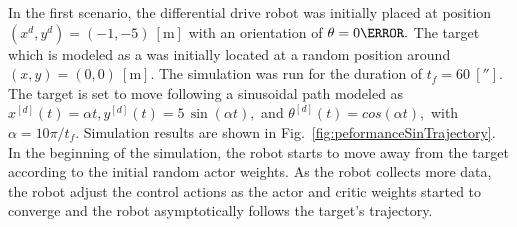 \documentclass[conference]{IEEEtran}
\begin{document}
 
 In the first scenario, the differential drive robot was initially placed at position $(x^d,y^d) = (-1,-5)~[\si{\meter}] $ with an orientation of $\theta = 0\degree.$ The target which is modeled as a  was initially located at a random position around  $(x,y) = (0,0)~[\si{\meter}].$ The simulation was run for the duration of $t_f=60~[\second].$ The target is set to move following a sinusoidal path modeled as  $
 x^{[d]}(t) = \alpha t, %
 y^{[d]}(t) = 5 \,\sin(\alpha t),$  and %
 $\theta^{[d]}(t) = cos(\alpha t),
 $ with $\alpha = 10\pi/t_f.$ Simulation results are shown in Fig.~\ref{fig:peformanceSinTrajectory}. In the beginning of the simulation, the robot starts to move away from the target according to the initial random actor weights. As the robot collects more data, the robot adjust the control actions as the actor and critic weights started to converge and the robot asymptotically follows the target's trajectory. %
%
\end{document}
